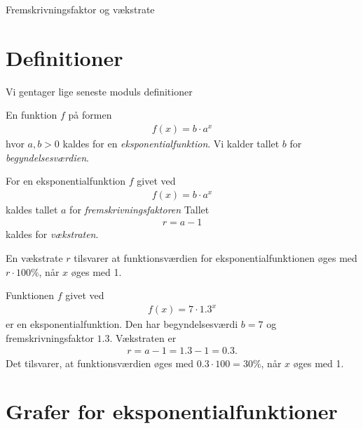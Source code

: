 
\begin{center}
\Huge
Fremskrivningsfaktor og vækstrate
\end{center}
\section*{Definitioner}

Vi gentager lige seneste moduls definitioner

\begin{defn}[Eksponentialfunktion]
	En funktion $f$ på formen
	\begin{align*}
		f(x) = b \cdot a^x
	\end{align*}
	hvor $a,b > 0$ kaldes for en \textit{eksponentialfunktion}.
	Vi kalder tallet $b$ for \textit{begyndelsesværdien}.
\end{defn}

\begin{defn}
	For en eksponentialfunktion $f$ givet ved
	\begin{align*}
		f(x) = b\cdot a^x
	\end{align*}
	kaldes tallet $a$ for \textit{fremskrivningsfaktoren}
	Tallet 
	\begin{align*}
		r = a - 1 
	\end{align*}
	kaldes for \textit{vækstraten}.
\end{defn}

\begin{setn}
	En vækstrate $r$ tilsvarer at funktionsværdien for eksponentialfunktionen øges med 
	$r \cdot 100\%$, når $x$ øges med 1. 
\end{setn}

\begin{exa}
	Funktionen $f$ givet ved
	\begin{align*}
		f(x) = 7\cdot 1.3^x
	\end{align*}
	er en eksponentialfunktion. Den har begyndelsesværdi $b = 7$ og fremskrivningsfaktor $1.3$.
	Vækstraten er 
	\begin{align*}
		r = a - 1 = 1.3 - 1 = 0.3.
	\end{align*}
	Det tilsvarer, at funktionsværdien øges med $0.3 \cdot 100 = 30\%$, når $x$ øges med 1. 
\end{exa}

\section*{Grafer for eksponentialfunktioner}

